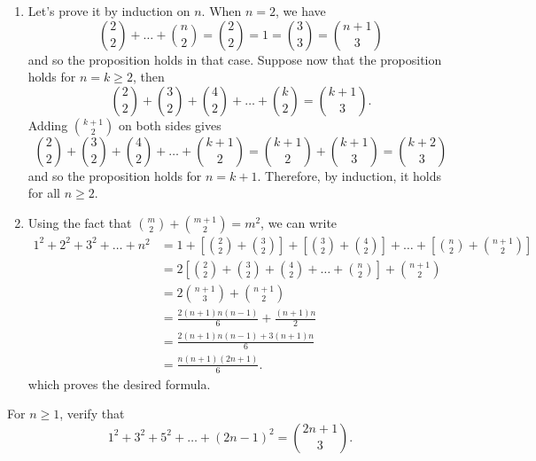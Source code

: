 \begin{solution}
    \begin{enumerate}
        \item Let's prove it by induction on $n$. When $n =2$, we have
        $$\binom{2}{2} + \dots + \binom{n }{2} = \binom{2}{2} = 1 = \binom{3 }{3} = \binom{n + 1}{3}$$
        and so the proposition holds in that case. Suppose now that the proposition holds for $n = k \geq 2$, then 
        $$\binom{2 }{2 } + \binom{3}{2} + \binom{4}{2} + \dots + \binom{k }{2} = \binom{k+1}{3}.$$
        Adding $\displaystyle \binom{k+1}{2}$ on both sides gives
        $$\binom{2 }{2 } + \binom{3}{2} + \binom{4}{2} + \dots + \binom{k +1 }{2} = \binom{k+1 }{2} + \binom{k+1}{3} = \binom{k+2}{3}$$
        and so the proposition holds for $n = k+1$. Therefore, by induction, it holds for all $n \geq 2$.
        \item Using the fact that $\displaystyle \binom{ m }{2} + \binom{m+1 }{2} = m^2$, we can write
        \begin{align*}
            1^2 + 2^2 + 3^2 + \dots + n^2 &= 1 + \left[\binom{2}{2} + \binom{3}{2}\right] + \left[\binom{3}{2} + \binom{4}{2}\right] + \dots + \left[\binom{n }{2} + \binom{n+1}{2}\right] \\
            &= 2\left[\binom{2}{2} + \binom{3}{2} + \binom{4}{2} + \dots + \binom{n }{2}\right] + \binom{n+1}{2} \\
            &= 2\binom{n+1}{3} + \binom{n+1}{2} \\
            &= \frac{2(n+1)n(n-1)}{6} + \frac{(n+1)n}{2} \\
            &= \frac{2(n+1)n(n-1) + 3(n+1)n}{6} \\
            &= \frac{n(n+1)(2n+1)}{6}.
        \end{align*}
        which proves the desired formula.
    \end{enumerate}
\end{solution}

\begin{exercise}
    For $n \geq 1$, verify that 
    $$1^2 + 3^2 + 5^2 + \dots + (2n-1)^2 = \binom{2n+1}{3}.$$
\end{exercise}


